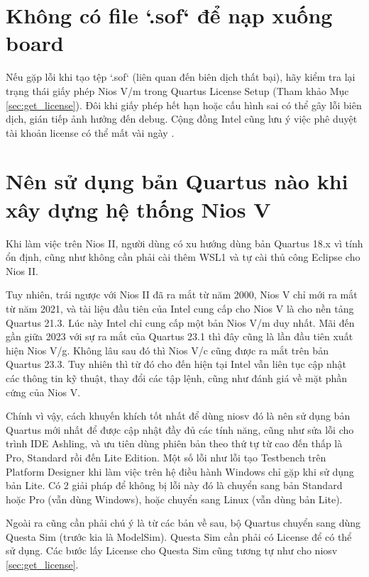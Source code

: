 \section{Không có file `.sof` để nạp xuống board}
Nếu gặp lỗi khi tạo tệp `.sof` (liên quan đến biên dịch thất bại), hãy kiểm tra lại trạng thái giấy phép Nios V/m trong Quartus License Setup (Tham khảo Mục \ref{sec:get_license}). Đôi khi giấy phép hết hạn hoặc cấu hình sai có thể gây lỗi biên dịch, gián tiếp ảnh hưởng đến debug. Cộng đồng Intel cũng lưu ý việc phê duyệt tài khoản license có thể mất vài ngày \cite{intel-forum-license}.

\section{Nên sử dụng bản Quartus nào khi xây dựng hệ thống Nios V}
\label{sec:quartus_edition}

Khi làm việc trên Nios II, người dùng có xu hướng dùng bản Quartus 18.x vì tính ổn định, cũng như không cần phải cài thêm WSL1 và tự cài thủ công Eclipse cho Nios II.

Tuy nhiên, trái ngược với Nios II đã ra mắt từ năm 2000, Nios V chỉ mới ra mắt từ năm 2021, và tài liệu đầu tiên của Intel cung cấp cho Nios V là cho nền tảng Quartus 21.3. Lúc này Intel chỉ cung cấp một bản Nios V/m duy nhất. Mãi đến gần giữa 2023 với sự ra mắt của Quartus 23.1 thì đây cũng là lần đầu tiên xuất hiện Nios V/g. Không lâu sau đó thì Nios V/c cũng được ra mắt trên bản Quartus 23.3. Tuy nhiên thì từ đó cho đến hiện tại Intel vẫn liên tục cập nhật các thông tin kỹ thuật, thay đổi các tập lệnh, cũng như đánh giá về mặt phần cứng của Nios V. \cite{niosv-reference-manual}

Chính vì vậy, cách khuyến khích tốt nhất để dùng \acrshort{niosv} đó là nên sử dụng bản Quartus mới nhất để được cập nhật đầy đủ các tính năng, cũng như sửa lỗi cho trình IDE Ashling, và ưu tiên dùng phiên bản theo thứ tự từ cao đến thấp là Pro, Standard rồi đến Lite Edition. Một số lỗi như lỗi tạo Testbench trên Platform Designer khi làm việc trên hệ điều hành Windows chỉ gặp khi sử dụng bản Lite. Có 2 giải pháp để không bị lỗi này đó là chuyển sang bản Standard hoặc Pro (vẫn dùng Windows), hoặc chuyển sang Linux (vẫn dùng bản Lite).

Ngoài ra cũng cần phải chú ý là từ các bản về sau, bộ Quartus chuyển sang dùng Questa Sim (trước kia là ModelSim). Questa Sim cần phải có License để có thể sử dụng. Các bước lấy License cho Questa Sim cũng tương tự như cho \acrshort{niosv} \ref{sec:get_license}.

